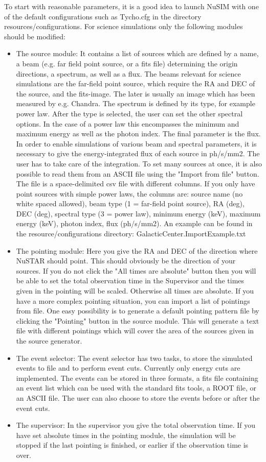 To start with reasonable parameters, it is a good idea to launch NuSIM with one of the default configurations such as Tycho.cfg in the directory resources/configurations.
For science simulations only the following modules should be modified:
\begin{itemize}
\item The source module: 
It contains a list of sources which are defined by a name, a beam (e.g. far field point source, or a fits file) determining the origin directions, a spectrum, as well as a flux.
The beams relevant for science simulations are the far-field point source, which require the RA and DEC of the source, and the fits-image. The later is usually an image which has been measured by e.g. Chandra.
The spectrum is defined by its type, for example power law. 
After the type is selected, the user can set the other spectral options.
In the case of a power law this encompasses the minimum and maximum energy as well as the photon index.
The final parameter is the flux.
In order to enable simulations of various beam and spectral parameters, it is necessary to give the energy-integrated flux of each source in ph/s/mm2. 
The user has to take care of the integration.
To set many sources at once, it is also possible to read them from an ASCII file using the "Import from file" button. 
The file is a space-delimited csv file with different columns. If you only have point sources with simple power laws, the columns are: source name (no white spaced allowed), beam type (1 = far-field point source), RA (deg), DEC (deg), spectral type (3 = power law), minimum energy (keV), maximum energy (keV), photon index, flux (ph/s/mm2).
An example can be found in the resource/configurations directory: GalacticCenter.ImportExample.txt
\item The pointing module: 
Here you give the RA and DEC of the direction where NuSTAR should point. 
This should obviously be the direction of your sources.
If you do not click the "All times are absolute" button then you will be able to set the total observation time in the Supervisor and the times given in the pointing will be scaled.
Otherwise all times are absolute. 
If you have a more complex pointing situation, you can import a list of pointings from file.
One easy possibility is to generate a default pointing pattern file by clicking the "Pointing" button in the source module. 
This will generate a text file with different pointings which will cover the area of the sources given in the source generator.
\item The event selector:
The event selector has two tasks, to store the simulated events to file and to perform event cuts.
Currently only energy cuts are implemented.
The events can be stored in three formats, a fits file containing an event list which can be used with the standard fits tools, a ROOT file, or an ASCII file.
The user can also choose to store the events before or after the event cuts.
\item The supervisor:
In the supervisor you give the total observation time. 
If you have set absolute times in the pointing module, the simulation will be stopped if the last pointing is finished, or earlier if the observation time is over. 
\end{itemize}
